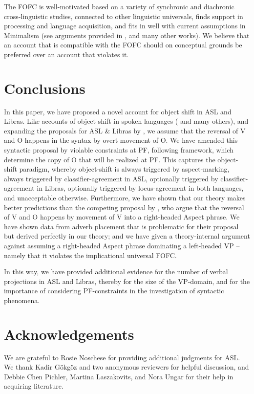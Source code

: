 \documentclass[output=paper]{langscibook}
\begin{document}
The FOFC is well-motivated based on a variety of synchronic
and diachronic cross-linguistic studies, connected to other linguistic
universals, finds support in processing and language acquisition, and
fits in well with current assumptions in Minimalism (see arguments
provided in \citealp{BiberauerHR.2014,SheehanBRH.2017}, and many other
works). We believe that an account that is compatible with the FOFC
should on conceptual grounds be preferred over an account that
violates it.

\section{Conclusions}
\label{lasz:sec:4}

In this paper, we have proposed a novel account for object shift in
ASL and Libras. Like accounts of object shift in spoken languages
(\citealp{Holmberg:1986} and many others), and expanding the proposals for
ASL \& Libras by \citet{Quadros.1999,Quadros.etal.2004,Quadros.DLM.2010,Gokgoz.2013}, 
we assume that the reversal
of V and O happens in the syntax by overt movement of O. We have
amended this syntactic proposal by violable constraints at PF,
following  framework, which
determine the copy of O that will be realized at PF. This captures the
object-shift paradigm, whereby object-shift is always triggered by
aspect-marking, always triggered by classifier-agreement in ASL,
optionally triggered by classifier-agreement in Libras, optionally
triggered by locus-agreement in both languages, and unacceptable
otherwise. Furthermore, we have shown that our theory makes better
predictions than the competing proposal by 
\citet{Fischer.Janis.1992,Matsuoka.1997,Braze.2004}, 
who argue that the reversal of V
and O happens by movement of V into a right-headed Aspect phrase.
We have shown data from adverb placement that is problematic for
their proposal but derived perfectly in our theory; and we have given a
theory-internal argument against assuming a right-headed Aspect
phrase dominating a left-headed VP -- namely that it violates the
implicational universal FOFC.

In this way, we have provided additional evidence for the
number of verbal projections in ASL and Libras, thereby for the size
of the VP-domain, and for the importance of considering
PF-constraints in the investigation of syntactic phenomena.

\section*{Acknowledgements}

We are grateful to Rosie Noschese for providing additional judgments
for ASL. We thank Kadir Gökgöz and two anonymous reviewers for
helpful discussion, and Debbie Chen Pichler, Martina Laszakovits, and
Nora Ungar for their help in acquiring literature. 

\printbibliography[heading=subbibliography,notkeyword=this]
\end{document}
